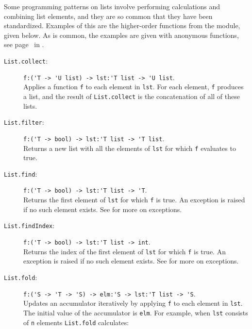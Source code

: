\documentclass[fsharpNotes.tex]{subfiles}
\begin{document}
Some programming patterns on lists involve performing calculations and combining list elements, and they are so common that they have been standardized. Examples of this are the higher-order functions from the module, given below. As is common, the examples are given with anonymous functions, see page~\pageref{page:anonymousFunction} in .
\begin{description}
\item[\texttt{List.collect}:] \lstinline{f:('T -> 'U list) -> lst:'T list -> 'U list}.~\\
  Applies a function \lstinline{f} to each element in \lstinline{lst}. For each element, \lstinline{f} produces a list, and the result of \lstinline{List.collect} is the concatenation of all of these lists.
\item[\texttt{List.filter}:] \lstinline{f:('T -> bool) -> lst:'T list -> 'T list}.~\\
  Returns a new list with all the elements of \lstinline{lst} for which \lstinline{f} evaluates to true.
\item[\texttt{List.find}:] \lstinline{f:('T -> bool) -> lst:'T list -> 'T}.~\\
  Returns the first element of \lstinline{lst} for which \lstinline{f} is true. An exception is raised if no such element exists. See  for more on exceptions.
\item[\texttt{List.findIndex}:] \lstinline{f:('T -> bool) -> lst:'T list -> int}.~\\
  Returns the index of the first element of \lstinline{lst} for which \lstinline{f} is true. An exception is raised if no such element exists. See  for more on exceptions.
\item[\texttt{List.fold}:] \lstinline{f:('S -> 'T -> 'S) -> elm:'S -> lst:'T list -> 'S}.~\\
  Updates an accumulator iteratively by applying \lstinline{f} to each element in \lstinline{lst}. The initial value of the accumulator is \lstinline{elm}. For example, when \lstinline{lst} consists of \lstinline{n} elements
  \lstinline{List.fold} calculates:
  \begin{quote}

\end{quote}
\end{description}
\end{document}
